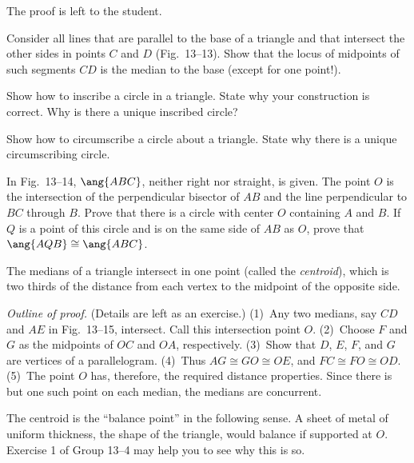 \documentclass[11pt]{book}
\theoremstyle{bkplain}
\theoremstyle{XIplainnote}
\theoremstyle{bkplain}
\theoremstyle{bkplain}
\begin{document}
The proof is left to the student.


\begin{exercisecols}
\begin{exlist}
\item Consider all lines that are parallel to the base of a triangle and that
      intersect the other sides in points $C$ and $D$ (Fig.~13--13). Show that
      the locus of midpoints of such segments $CD$ is the median to the base
      (except for one point!).
\exfig{\FIGXIIITHIRTEEN}
\item Show how to inscribe a circle in a triangle. State why your construction
      is correct. Why is there a unique inscribed circle?
\item Show how to circumscribe a circle about a triangle. State why there is a
      unique circumscribing circle.
\item In Fig.~13--14, $\ang{ABC}$, neither right nor straight, is given. The
      point $O$ is the intersection of the perpendicular bisector of $AB$ and
      the line perpendicular to $BC$ through $B$. Prove that there is a circle
      with center $O$ containing $A$ and $B$. If $Q$ is a point of this circle
      and is on the same side of $AB$ as $O$, prove that
      $\ang{AQB} \cong \ang{ABC}$.
\exfig{\FIGXIIIFOURTEEN}
\end{exlist}
\end{exercisecols}

\begin{theorem}
The medians of a triangle intersect in one point (called the \emph{centroid}),
which is two thirds of the distance from each vertex to the midpoint of the
opposite side.
\end{theorem}

\noindent\emph{Outline of proof.} (Details are left as an exercise.) (1)~Any two
medians, say $CD$ and $AE$ in Fig.~13--15, intersect. Call this intersection
point $O$. (2)~Choose $F$ and $G$ as the midpoints of $OC$ and $OA$,
respectively. (3)~Show that $D$, $E$, $F$, and $G$ are vertices of a
parallelogram. (4)~Thus $AG \cong GO \cong OE$, and $FC \cong FO \cong OD$.
(5)~The point $O$ has, therefore, the required distance properties. Since there
is but one such point on each median, the medians are concurrent.

The centroid is the ``balance point'' in the following sense. A sheet of metal
of uniform thickness, the shape of the triangle, would balance if supported at
$O$. Exercise 1 of Group 13--4 may help you to see why this is so.
\end{document}

